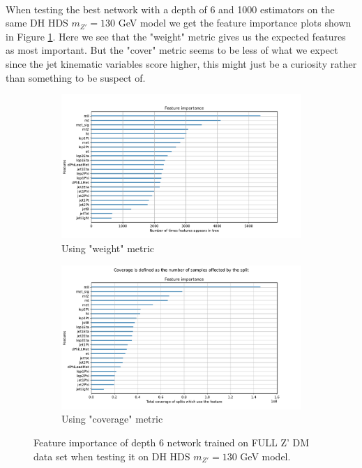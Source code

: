 \documentclass[12pt, a4paper]{book}
\begin{document}
\\When testing the best network with a depth of 6 and 1000 estimators on the same DH HDS $m_{Z'}=130$ GeV model we get the feature importance plots shown in Figure \ref{fig:BDT_feat}. 
Here we see that the "weight" metric gives us the expected features as most important. But the "cover" metric seems to be less of what we expect since the jet kinematic variables score higher, 
this might just be a curiosity rather than something to be suspect of.
\graphicspath{{../../../Plots/XGBoost/FULL/GRIDSEARCH_n_est_10-1000/DH_HDS_mZp_130/feature_importance/}}
\begin{figure}[!ht]
	\centering
   \begin{subfigure}[b]{0.8\textwidth}
      \centering
      \includegraphics[width=1\textwidth]{weight.pdf}
      \caption{Using "weight" metric}
   \end{subfigure}
   \hfill
   \begin{subfigure}[b]{0.8\textwidth}
      \centering
      \includegraphics[width=1\textwidth]{total_cover.pdf}
      \caption{Using "coverage" metric}
   \end{subfigure}
   \caption[Feature importance plots of BDT]{Feature importance of depth 6 network trained on FULL Z' DM data set when testing it on DH HDS $m_{Z'}=130$ GeV model.}\label{fig:BDT_feat}
\end{figure}
\end{document}
